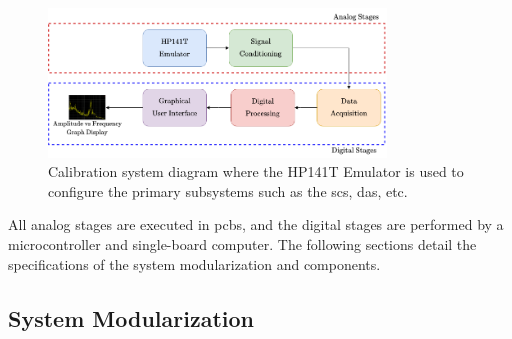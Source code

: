 \documentclass[class=report,11pt,crop=false]{standalone}
\begin{document}
	\begin{figure}[ht!]
		\centering
		\includegraphics[width=0.80\textwidth]{Figures/Methodology/emulated-system-diagram}
		\caption{Calibration system diagram where the HP141T Emulator is used to configure the primary subsystems such as the \acrshort{scs}, \acrshort{das}, etc.}
		\label{fig:emulated-system-diagram}
	\end{figure}

	All analog stages are executed in \acrshort{pcb}s, and the digital stages are performed by a microcontroller and single-board computer. The following sections detail the specifications of the system modularization and components.

	\subsection{System Modularization}
	
\end{document}
